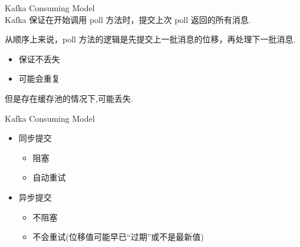\begin{frame}[plain,t]{Kafka Consuming Model} %
	 \\  \vspace{2ex}
	Kafka 保证在开始调用 poll 方法时，提交上次 poll 返回的所有消息. 
	
	\vspace{2ex}
	从顺序上来说，poll 方法的逻辑是先提交上一批消息的位移，再处理下一批消息.
	\begin{itemize}
		\item 保证不丢失
		\item 可能会重复
	\end{itemize}

\vspace{2ex}
但是存在缓存池的情况下,可能丢失.


\end{frame}

\begin{frame}[plain,t]{Kafka Consuming Model} %
	 \\  \vspace{2ex}
	\begin{itemize}
		\item 同步提交 
		\begin{itemize}
			\item 阻塞
			\item 自动重试
		\end{itemize}
		\item 异步提交
		\begin{itemize}
			\item 不阻塞
			\item 不会重试(位移值可能早已“过期”或不是最新值)
		\end{itemize}
	\end{itemize}
\end{frame}

